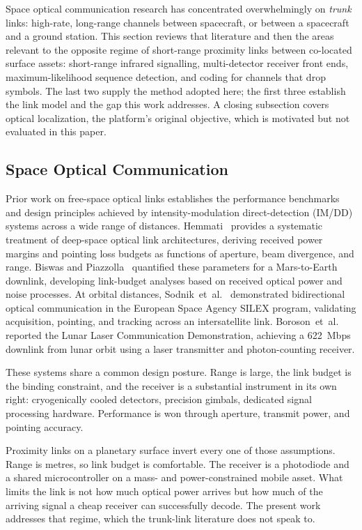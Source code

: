 Space optical communication research has concentrated overwhelmingly on
\emph{trunk} links: high-rate, long-range channels between spacecraft, or
between a spacecraft and a ground station. This section reviews that literature
and then the areas relevant to the opposite regime of short-range proximity
links between co-located surface assets: short-range infrared signalling,
multi-detector receiver front ends, maximum-likelihood sequence detection, and
coding for channels that drop symbols. The last two supply the method adopted
here; the first three establish the link model and the gap this work addresses.
A closing subsection covers optical localization, the platform's original
objective, which is motivated but not evaluated in this paper.

\subsection{Space Optical Communication}

Prior work on free-space optical links establishes the performance benchmarks
and design principles achieved by intensity-modulation direct-detection (IM/DD)
systems across a wide range of distances. Hemmati~\cite{Hemmati2006} provides a
systematic treatment of deep-space optical link architectures, deriving received
power margins and pointing loss budgets as functions of aperture, beam
divergence, and range. Biswas and Piazzolla~\cite{Biswas2003} quantified these
parameters for a Mars-to-Earth downlink, developing link-budget analyses based
on received optical power and noise processes. At orbital distances,
Sodnik~et~al.~\cite{Sodnik2010} demonstrated bidirectional optical
communication in the European Space Agency SILEX program, validating
acquisition, pointing, and tracking across an intersatellite link.
Boroson~et~al.~\cite{Boroson2014} reported the Lunar Laser Communication
Demonstration, achieving a 622~Mbps downlink from lunar orbit using a laser
transmitter and photon-counting receiver.

These systems share a common design posture. Range is large, the link budget is
the binding constraint, and the receiver is a substantial instrument in its own
right: cryogenically cooled detectors, precision gimbals, dedicated signal
processing hardware. Performance is won through aperture, transmit power, and
pointing accuracy.

Proximity links on a planetary surface invert every one of those assumptions.
Range is metres, so link budget is comfortable. The receiver is a photodiode
and a shared microcontroller on a mass- and power-constrained mobile asset.
What limits the link is not how much optical power arrives but how much of the
arriving signal a cheap receiver can successfully decode. The present work
addresses that regime, which the trunk-link literature does not speak to.

